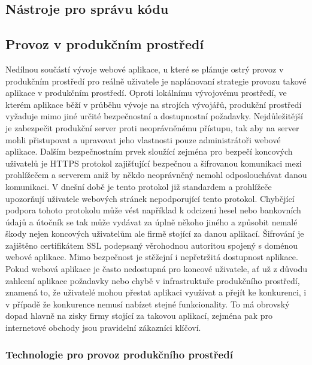 	\subsection{Nástroje pro správu kódu}


	\subsection{Provoz v produkčním prostředí}

	Nedílnou součástí vývoje webové aplikace, u které se plánuje ostrý provoz v produkčním prostředí pro reálně uživatele
	je naplánovaní strategie provozu takové aplikace v produkčním prostředí.
	Oproti lokálnímu vývojovému prostředí, ve kterém aplikace běží v průběhu vývoje na strojích vývojářů, produkční
	prostředí vyžaduje mimo jiné určité bezpečnostní a dostupnostní požadavky.
	Nejdůležitější je zabezpečit produkční server proti neoprávněnému přístupu, tak aby na server mohli přistupovat a
	upravovat jeho vlastnosti pouze administrátoři webové aplikace.
	Dalším bezpečnostním prvek sloužící zejména pro bezpečí koncových uživatelů je HTTPS protokol zajišťující bezpečnou
	a šifrovanou komunikaci mezi prohlížečem a serverem aniž by někdo neoprávněný nemohl odposlouchávat danou komunikaci.
	V dnešní době je tento protokol již standardem a prohlížeče upozorňují uživatele webových stránek nepodporující tento
	protokol.
	Chybějící podpora tohoto protokolu může vést například k odcizení hesel nebo bankovních údajů a útočník se tak
	může vydávat za úplně někoho jiného a způsobit nemalé škody nejen koncových uživatelům ale firmě stojící za danou
	aplikací.
	Šifrování je zajištěno certifikátem SSL podepsaný věrohodnou autoritou spojený s doménou webové aplikace.
	Mimo bezpečnost je stěžejní i nepřetržitá dostupnost aplikace.
	Pokud webová aplikace je často nedostupná pro koncové uživatele, ať už z důvodu zahlcení aplikace požadavky nebo
	chybě v infrastruktuře produkčního prostředí, znamená to, že uživatelé mohou přestat aplikaci využívat a přejít
	ke konkurenci, i v případě že konkurence nemusí nabízet stejné funkcionality.
	To má obrovský dopad hlavně na zisky firmy stojící za takovou aplikací, zejména pak pro internetové obchody jsou
	pravidelní zákazníci klíčoví.

		\subsubsection{Technologie pro provoz produkčního prostředí}

